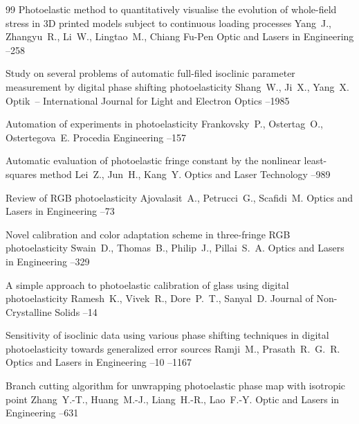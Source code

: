 \begin{thebibliography}{99}
\paper Photoelastic method to quantitatively visualise the evolution of whole-field stress in 3D printed models subject to continuous loading processes
\by  Yang~J., Zhangyu~R., Li~W., Lingtao~M., Chiang Fu-Pen
\jour  Optic and Lasers in Engineering
--258


\paper Study on several problems of automatic full-filed isoclinic parameter measurement  by digital phase shifting photoelasticity
\by Shang~W., Ji~X., Yang~X.
\jour Optik~– International Journal for Light and Electron Optics
--1985

\paper Automation of experiments in photoelasticity
\by Frankovsky~P., Ostertag~O., Ostertegova~E.
\jour Procedia Engineering
--157


\paper Automatic evaluation of photoelastic fringe constant by the nonlinear least-squares method
\by  Lei~Z., Jun~H., Kang~Y.
\jour Optics and Laser Technology
--989

\paper Review of RGB photoelasticity
\by  Ajovalasit~A., Petrucci~G., Scafidi~M.
\jour Optics and Lasers in Engineering
--73

\paper Novel calibration and color adaptation scheme in three-fringe RGB photoelasticity
\by Swain~D., Thomas~B., Philip~J., Pillai~S.~A.
\jour Optics and Lasers in Engineering
--329

\paper A simple approach to photoelastic calibration of glass using digital photoelasticity
\by Ramesh~K., Vivek~R., Dore~P.~T., Sanyal~D.
\jour Journal of Non-Crystalline Solids
--14

\paper Sensitivity of isoclinic data using various phase shifting techniques in digital photoelasticity towards generalized error sources
\by Ramji~M., Prasath~R.~G.~R.
\jour Optics and Lasers in Engineering
--10
--1167


\paper Branch cutting algorithm for unwrapping photoelastic phase map with isotropic point
\by Zhang~Y.-T., Huang~M.-J., Liang~H.-R., Lao~F.-Y.
\jour Optic and Lasers in Engineering
--631


\end{thebibliography}
